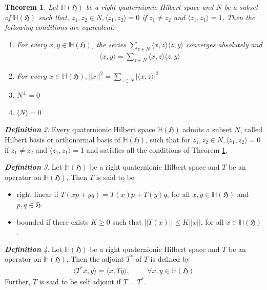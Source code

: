 \documentclass[a4paper,12pt,reqno]{amsart}
\theoremstyle{plain}
\newtheorem{theorem}{\bf Theorem}[section]
\theoremstyle{remark}
\newtheorem{definition}[theorem]{\bf Definition}
\begin{document}
	\begin{theorem}\cite{o}\label{c}
		Let $\mathbb{H}(\mathfrak{H})$ be a right quaternionic Hilbert space and $N$ be a subset of $\mathbb{H}(\mathfrak{H})$ such that, $z_1, z_2 \in N, \langle z_1, z_2 \rangle =0$ if $z_1 \neq z_2$ and $\langle z_1, z_1 \rangle =1$. Then the following conditions are equivalent:
		\begin{enumerate}
			\item [(a)] For every $x, y \in \mathbb{H}(\mathfrak{H})$, the series $\sum_{z\in N} \langle x, z \rangle \langle z, y \rangle$ converges absolutely and 
			\begin{align*}
				\langle x, y \rangle= \sum_{z\in N} \langle x, z \rangle \langle z, y \rangle
			\end{align*}
			\item [(b)] For every $x\in \mathbb{H}(\mathfrak{H}), ||x||^2 = \sum_{z\in N} |\langle x, z \rangle |^2$
			\item [(c)] $N^{\perp}=0$
			\item [(d)] $\langle N \rangle =0$
		\end{enumerate}
	\end{theorem}
	\begin{definition}\cite{o}
		Every quaternionic Hilbert space $\mathbb{H}(\mathfrak{H})$ admits a subset $N$, called Hilbert basis or orthonormal basis of $\mathbb{H}(\mathfrak{H})$, such that for $z_1, z_2 \in N, \langle z_1, z_2 \rangle =0$ if $z_1 \neq z_2$ and $\langle z_1, z_1 \rangle =1$ and satisfies all the conditions of Theorem \ref{c}.
	\end{definition}
	\begin{definition}\cite{p}
		Let $\mathbb{H}(\mathfrak{H})$ be a right quaternionic Hilbert space and $T$ be an operator on $\mathbb{H}(\mathfrak{H})$. Then $T$ is said to be 
		\begin{itemize}
			\item right linear if $T(xp+yq)=T(x)p + T(y)q$, for all $x, y \in \mathbb{H}(\mathfrak{H})$ and $p,q \in \mathfrak{H}$.
			\item bounded if there exists $K \geq 0$ such that $||T(x)|| \leq K ||x||$, for all $x \in \mathbb{H}(\mathfrak{H})$.            
		\end{itemize}
	\end{definition}
	
	\begin{definition}\cite{p}
		Let $\mathbb{H}(\mathfrak{H})$ be a right quaternionic Hilbert space and $T$ be an operator on $\mathbb{H}(\mathfrak{H})$. Then the adjoint $T^*$ of $T$ is defined by 
		\begin{align*}
			\langle T^*x, y \rangle = \langle x, Ty \rangle ,\hspace{1cm} \forall x, y \in \mathbb{H}(\mathfrak{H})
		\end{align*}
		Further, $T$ is said to be self adjoint if $T=T^*$.
	\end{definition}
	
\end{document}
